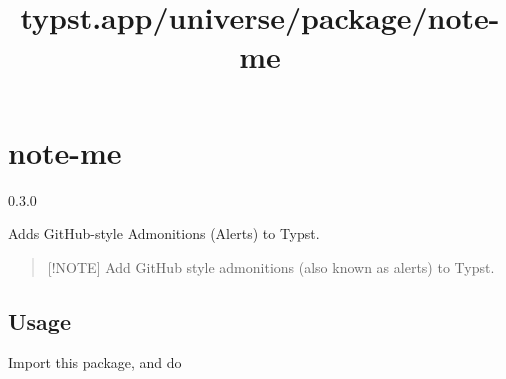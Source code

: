 \title{typst.app/universe/package/note-me}

\label{banner}
\section{note-me}\label{note-me}

{ 0.3.0 }

Adds GitHub-style Admonitions (Alerts) to Typst.

\label{readme}
\begin{quote}
{[}!NOTE{]} Add GitHub style admonitions (also known as alerts) to
Typst.
\end{quote}

\subsection{Usage}\label{usage}

Import this package, and do

